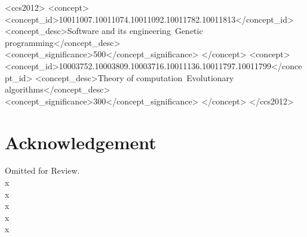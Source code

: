 \documentclass[sigconf]{acmart}
\begin{document}
%
%
\begin{CCSXML}
<ccs2012>
<concept>
<concept_id>10011007.10011074.10011092.10011782.10011813</concept_id>
<concept_desc>Software and its engineering~Genetic programming</concept_desc>
<concept_significance>500</concept_significance>
</concept>
<concept>
<concept_id>10003752.10003809.10003716.10011136.10011797.10011799</concept_id>
<concept_desc>Theory of computation~Evolutionary algorithms</concept_desc>
<concept_significance>300</concept_significance>
</concept>
</ccs2012>
\end{CCSXML}



\maketitle



\section{Acknowledgement}

Omitted for Review. \\
x \\
x \\
x \\
x \\
x


 

\end{document}
